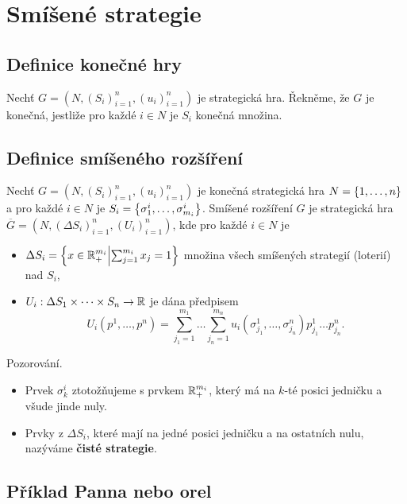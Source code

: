 \section{Smíšené strategie}
\subsection{Definice konečné hry}\label{konecna}
Nechť $G = (N, (S_i)_{i=1}^n, (u_i)_{i=1}^n)$ je strategická hra. Řekněme, že $G$ je konečná, jestliže pro každé 
$i \in N$ je $S_i$ konečná množina.

\subsection{Definice smíšeného rozšíření}\label{smisRoz}
Nechť $G = (N, (S_i)_{i=1}^n, (u_i)_{i=1}^n)$ je konečná strategická hra $N = \left\lbrace 1, \dots, n \right\rbrace$ a pro každé $i \in N$ je
$S_i = \left\lbrace \sigma_1^i, \dots, \sigma_{m_i}^i \right\rbrace$. Smíšené rozšíření $G$ je strategická hra 
$\overline{G} = (N, (\Delta S_i)_{i=1}^n, (U_i)_{i=1}^n)$, kde pro každé $i \in N$ je
\begin{itemize}
    \item $\Delta S_i = \left\lbrace x \in \mathbb{R}_+^{m_i} \middle| \sum_{j=1}^{m_i}x_j = 1 \right\rbrace$ množina všech smíšených strategií 
    (loterií) nad $S_i$,
    \item $U_i : \Delta S_1 \times \dots \times S_n \rightarrow \mathbb{R}$ je dána předpisem
    \[
        U_i (p^1, \dots, p^n) = \sum_{j_1 = 1}^{m_1} \dots \sum_{j_n=1}^{m_n} u_i(\sigma_{j_1}^1, \dots, \sigma_{j_n}^n)
        p_{j_1}^1 \dots p_{j_n}^n.
    \]
\end{itemize}
Pozorování.
\begin{itemize}
    \item Prvek $\sigma_k^i$ ztotožňujeme s prvkem $\mathbb{R}_+^{m_i}$, který má na $k$-té posici jedničku a všude jinde nuly.
    \item Prvky z $\Delta S_i$, které mají na jedné posici jedničku a na ostatních nulu, nazýváme 
    \textbf{čisté strategie}.
\end{itemize}

\subsection{Příklad Panna nebo orel}

